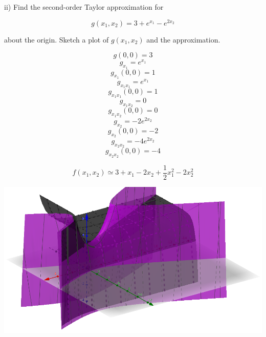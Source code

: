 \documentclass{article}
\begin{document}
\indent \indent ii) Find the second-order Taylor approximation for

\[g(x_1, x_2) = 3 + e^{x_1} - e^{2x_2}\]

about the origin. Sketch a plot of $g(x_1, x_2)$ and the approximation.


\[g(0, 0) = 3\]
\[g_{x_1} = e^{x_1}\]
\[g_{x_1}(0, 0) = 1\]
\[g_{x_1 x_1} = e^{x_1}\]
\[g_{x_1 x_1}(0, 0) = 1\]
\[g_{x_1 x_2} = 0\]
\[g_{x_1 x_2}(0, 0) = 0\]
\[g_{x_2} = -2e^{2x_2}\]
\[g_{x_2}(0, 0) = -2\]
\[g_{x_2 x_2} = -4e^{2x_2}\]
\[g_{x_2 x_2}(0, 0) = -4\]


\[f(x_1, x_2) \simeq 3 + x_1 -2x_2 + \frac{1}{2}x_1^2 -2x_2^2\]


\includegraphics[width=\linewidth]{2d_taylor_approximation}
\end{document}
